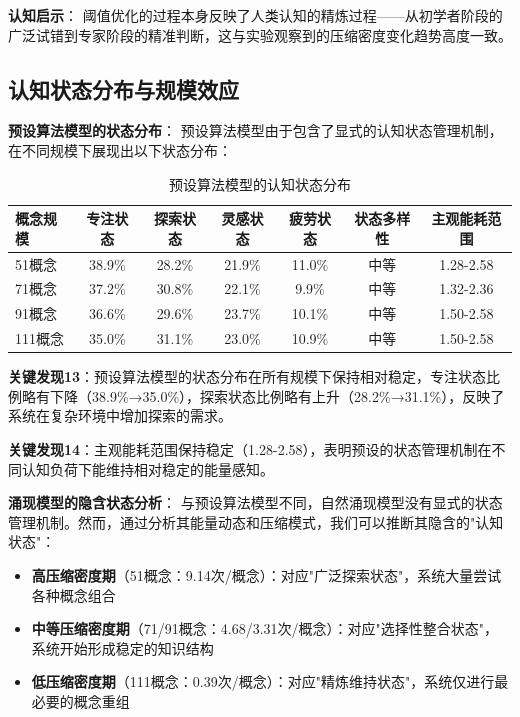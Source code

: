 \documentclass[12pt,a4paper]{article}
\begin{document}
\textbf{认知启示}：
阈值优化的过程本身反映了人类认知的精炼过程——从初学者阶段的广泛试错到专家阶段的精准判断，这与实验观察到的压缩密度变化趋势高度一致。

\subsection{认知状态分布与规模效应}

\textbf{预设算法模型的状态分布}：
预设算法模型由于包含了显式的认知状态管理机制，在不同规模下展现出以下状态分布：

\begin{table}[h]
\centering
\caption{预设算法模型的认知状态分布}
\label{tab:cognitive_state_scale}
\begin{tabular}{p{1.8cm}cccccc}
\toprule
\textbf{概念规模} & \textbf{专注状态} & \textbf{探索状态} & \textbf{灵感状态} & \textbf{疲劳状态} & \textbf{状态多样性} & \textbf{主观能耗范围} \\
\midrule
51概念 & 38.9\% & 28.2\% & 21.9\% & 11.0\% & 中等 & 1.28-2.58 \\
71概念 & 37.2\% & 30.8\% & 22.1\% & 9.9\% & 中等 & 1.32-2.36 \\
91概念 & 36.6\% & 29.6\% & 23.7\% & 10.1\% & 中等 & 1.50-2.58 \\
111概念 & 35.0\% & 31.1\% & 23.0\% & 10.9\% & 中等 & 1.50-2.58 \\
\bottomrule
\end{tabular}
\end{table}

\textbf{关键发现13}：预设算法模型的状态分布在所有规模下保持相对稳定，专注状态比例略有下降（38.9\%→35.0\%），探索状态比例略有上升（28.2\%→31.1\%），反映了系统在复杂环境中增加探索的需求。

\textbf{关键发现14}：主观能耗范围保持稳定（1.28-2.58），表明预设的状态管理机制在不同认知负荷下能维持相对稳定的能量感知。

\textbf{涌现模型的隐含状态分析}：
与预设算法模型不同，自然涌现模型没有显式的状态管理机制。然而，通过分析其能量动态和压缩模式，我们可以推断其隐含的"认知状态"：

\begin{itemize}
\item \textbf{高压缩密度期}（51概念：9.14次/概念）：对应"广泛探索状态"，系统大量尝试各种概念组合
\item \textbf{中等压缩密度期}（71/91概念：4.68/3.31次/概念）：对应"选择性整合状态"，系统开始形成稳定的知识结构
\item \textbf{低压缩密度期}（111概念：0.39次/概念）：对应"精炼维持状态"，系统仅进行最必要的概念重组
\end{itemize}
\end{document}
